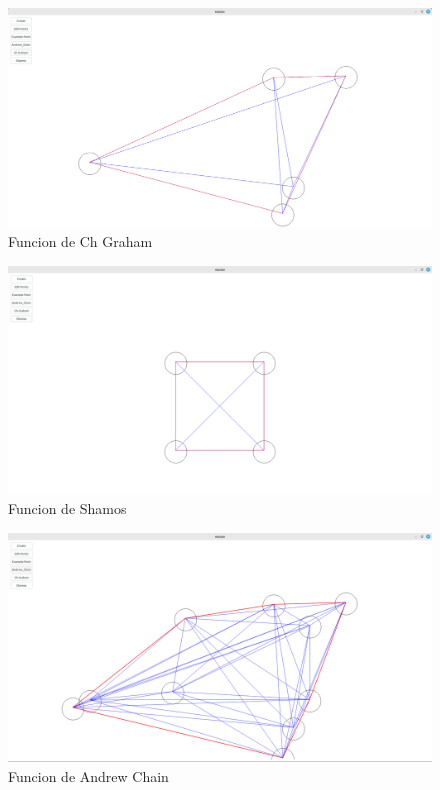 \documentclass[conference]{IEEEtran}
\begin{document}
\begin{enumerate}
\begin{figure}[h]
    \centering
    \includegraphics[width=0.8\linewidth]{images/6.png}
    \caption{Funcion de Ch Graham}
    \label{fig:funcion_ch}
\end{figure}

\begin{figure}[h]
    \centering
    \includegraphics[width=0.8\linewidth]{images/7.png}
    \caption{Funcion de Shamos}
    \label{fig:funcion_sh}
\end{figure}

\begin{figure}[h]
    \centering
    \includegraphics[width=0.8\linewidth]{images/8.png}
    \caption{Funcion de Andrew Chain}
    \label{fig:funcion_an}
\end{figure}

\end{enumerate}
\end{document}

